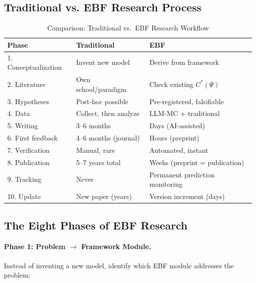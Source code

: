 \subsection{Traditional vs. EBF Research Process}

\begin{table}[htbp]
\centering
\caption{Comparison: Traditional vs.\ EBF Research Workflow}
\label{tab:workflow-comparison}
\renewcommand{\arraystretch}{1.3}
\small
\begin{tabular}{@{}lp{5cm}p{5cm}@{}}
\toprule
\textbf{Phase} & \textbf{Traditional} & \textbf{EBF} \\
\midrule
1. Conceptualization & Invent new model & Derive from framework \\
2. Literature & Own school/paradigm & Check existing $C^*(\Psi)$ \\
3. Hypotheses & Post-hoc possible & Pre-registered, falsifiable \\
4. Data & Collect, then analyze & LLM-MC + traditional \\
5. Writing & 3--6 months & Days (AI-assisted) \\
6. First feedback & 4--6 months (journal) & Hours (preprint) \\
7. Verification & Manual, rare & Automated, instant \\
8. Publication & 5--7 years total & Weeks (preprint = publication) \\
9. Tracking & Never & Permanent prediction monitoring \\
10. Update & New paper (years) & Version increment (days) \\
\bottomrule
\end{tabular}
\end{table}

\subsection{The Eight Phases of EBF Research}

\paragraph{Phase 1: Problem $\to$ Framework Module.}

Instead of inventing a new model, identify which EBF module addresses the problem:


